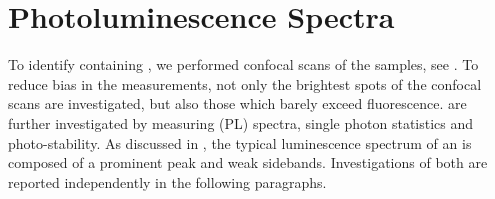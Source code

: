 
\section{Photoluminescence Spectra} \label{sec::spectra}

	To identify \nds containing \sivs, we performed confocal scans of the samples, see . 
	To reduce bias in the measurements, not only the brightest spots of the confocal scans are investigated, but also those which barely exceed \bkg fluorescence.
	\sivs are further investigated by measuring \pl (PL) spectra, single photon statistics and photo-stability.
	As discussed in , the typical luminescence spectrum of an \siv is composed of a prominent \zpl peak and weak sidebands.
	Investigations of both are reported independently in the following paragraphs.

